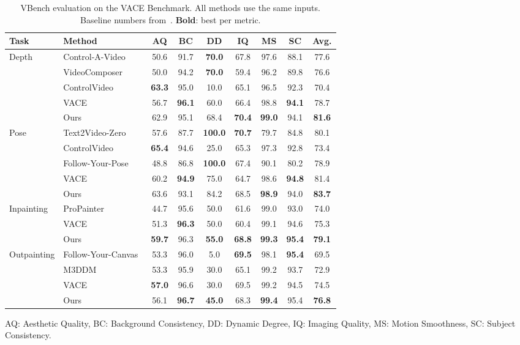 \begin{table}[t]
\centering
\caption{VBench evaluation on the VACE Benchmark. All methods use the same inputs. Baseline numbers from~\protect\cite{jiang2025vace}. \textbf{Bold}: best per metric.}
\label{tab:vbench_comparison}
\setlength{\tabcolsep}{4pt}
\begin{tabular}{llccccccc}
\toprule
Task & Method & AQ & BC & DD & IQ & MS & SC & Avg. \\
\midrule
\multirow{5}{*}{Depth} 
& Control-A-Video~\cite{chen2023controlavideo} & 50.6 & 91.7 & \textbf{70.0} & 67.8 & 97.6 & 88.1 & 77.6 \\
& VideoComposer~\cite{wang2023videocomposer} & 50.0 & 94.2 & \textbf{70.0} & 59.4 & 96.2 & 89.8 & 76.6 \\
& ControlVideo~\cite{zhao2023controlvideo} & \textbf{63.3} & 95.0 & 10.0 & 65.1 & 96.5 & 92.3 & 70.4 \\
& VACE & 56.7 & \textbf{96.1} & 60.0 & 66.4 & 98.8 & \textbf{94.1} & 78.7 \\
& Ours & 62.9 & 95.1 & 68.4 & \textbf{70.4} & \textbf{99.0} & 94.1 & \textbf{81.6} \\
\midrule
\multirow{5}{*}{Pose} 
& Text2Video-Zero~\cite{khachatryan2023text2videozero} & 57.6 & 87.7 & \textbf{100.0} & \textbf{70.7} & 79.7 & 84.8 & 80.1 \\
& ControlVideo~\cite{zhao2023controlvideo} & \textbf{65.4} & 94.6 & 25.0 & 65.3 & 97.3 & 92.8 & 73.4 \\
& Follow-Your-Pose~\cite{ma2024followyourpose} & 48.8 & 86.8 & \textbf{100.0} & 67.4 & 90.1 & 80.2 & 78.9 \\
& VACE & 60.2 & \textbf{94.9} & 75.0 & 64.7 & 98.6 & \textbf{94.8} & 81.4 \\
& Ours & 63.6 & 93.1 & 84.2 & 68.5 & \textbf{98.9} & 94.0 & \textbf{83.7} \\
\midrule
\multirow{3}{*}{Inpainting} 
& ProPainter~\cite{zhou2023propainter} & 44.7 & 95.6 & 50.0 & 61.6 & 99.0 & 93.0 & 74.0 \\
& VACE & 51.3 & \textbf{96.3} & 50.0 & 60.4 & 99.1 & 94.6 & 75.3 \\
& Ours & \textbf{59.7} & 96.3 & \textbf{55.0} & \textbf{68.8} & \textbf{99.3} & \textbf{95.4} & \textbf{79.1} \\
\midrule
\multirow{4}{*}{Outpainting} 
& Follow-Your-Canvas~\cite{chen2024followyourcanvas} & 53.3 & 96.0 & 5.0 & \textbf{69.5} & 98.1 & \textbf{95.4} & 69.5 \\
& M3DDM~\cite{fan2023m3ddm} & 53.3 & 95.9 & 30.0 & 65.1 & 99.2 & 93.7 & 72.9 \\
& VACE & \textbf{57.0} & 96.6 & 30.0 & 69.5 & 99.2 & 94.5 & 74.5 \\
& Ours & 56.1 & \textbf{96.7} & \textbf{45.0} & 68.3 & \textbf{99.4} & 95.4 & \textbf{76.8} \\
\bottomrule
\end{tabular}
\vspace{1mm}
\small

AQ: Aesthetic Quality, BC: Background Consistency, DD: Dynamic Degree, IQ: Imaging Quality, MS: Motion Smoothness, SC: Subject Consistency.
\end{table}
